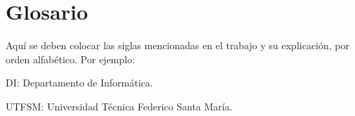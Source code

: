 \section*{Glosario}
Aquí se deben colocar las siglas mencionadas en el trabajo y su explicación, por orden alfabético. Por ejemplo: \\

{\setlength{\parskip}{0cm} %
DI: Departamento de Informática.

UTFSM: Universidad Técnica Federico Santa María.
}
